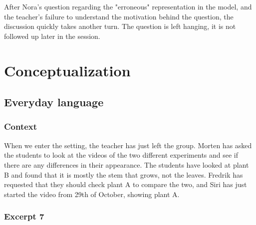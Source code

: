 After Nora's question regarding the "erroneous" representation in the model, and the teacher's failure to understand the motivation behind the question, the discussion quickly takes another turn. The question is left hanging, it is not followed up later in the session.



\section{Conceptualization}
\label{cha:conceptualization}

\subsection{Everyday language}

\subsubsection*{Context}
When we enter the setting, the teacher has just left the group. Morten has asked the students to look at the videos of the two different experiments and see if there are any differences in their appearance. The students have looked at plant B and found that it is mostly the stem that grows, not the leaves. Fredrik has requested that they should check plant A to compare the two, and Siri has just started the video from 29th of October, showing plant A. 


\subsubsection*{Excerpt 7}\label{ex:excerpt7}

